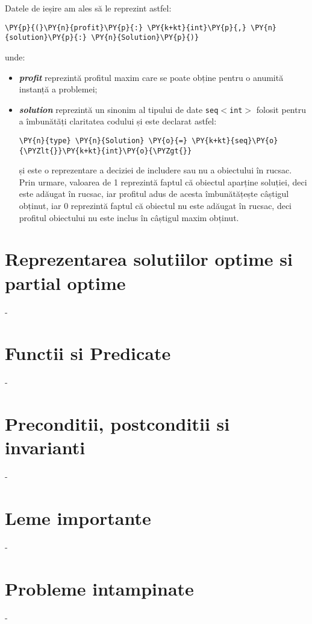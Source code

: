 \begin{sloppypar}
Datele de ieșire am ales să le reprezint astfel:
\begin{Verbatim}[commandchars=\\\{\}]
                \PY{p}{(}\PY{n}{profit}\PY{p}{:} \PY{k+kt}{int}\PY{p}{,} \PY{n}{solution}\PY{p}{:} \PY{n}{Solution}\PY{p}{)}
\end{Verbatim}
unde:
\begin{itemize}
    \item \textit{\textbf{\textcolor{coleight}{profit}}} reprezintă profitul maxim care se poate obține pentru o anumită instanță a problemei;
    \item \textit{\textbf{\textcolor{coleight}{solution}}} reprezintă un sinonim al tipului de date \texttt{seq\(<\)int\(>\)} folosit pentru a îmbunătăți claritatea codului și este declarat astfel:
\begin{Verbatim}[commandchars=\\\{\}]
                \PY{n}{type} \PY{n}{Solution} \PY{o}{=} \PY{k+kt}{seq}\PY{o}{\PYZlt{}}\PY{k+kt}{int}\PY{o}{\PYZgt{}}
\end{Verbatim}
și este o reprezentare a deciziei de includere sau nu a obiectului în rucsac. Prin urmare, valoarea de 1 reprezintă faptul că obiectul aparține soluției, deci este adăugat în rucsac, iar profitul adus de acesta îmbunătățește câștigul obținut, iar 0 reprezintă faptul că obiectul nu este adăugat în rucsac, deci profitul obiectului nu este inclus în câștigul maxim obținut.
\end{itemize} 

\end{sloppypar}

\section{Reprezentarea solutiilor optime si partial optime}

-

\section{Functii si Predicate}

-

\section{Preconditii, postconditii si invarianti}

-

\section{Leme importante}

-

\section{Probleme intampinate}

-